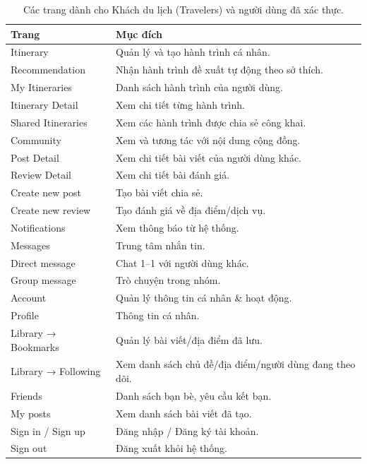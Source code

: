 \begin{table}[H]
\centering
\begin{tabular}{|p{5cm}|p{10cm}|}
\hline
Trang                & Mục đích                                                \\ \hline
Itinerary           & Quản lý và tạo hành trình cá nhân.                      \\ \hline
Recommendation      & Nhận hành trình đề xuất tự động theo sở thích.          \\ \hline
My Itineraries      & Danh sách hành trình của người dùng.                    \\ \hline
Itinerary Detail    & Xem chi tiết từng hành trình.                           \\ \hline
Shared Itineraries  & Xem các hành trình được chia sẻ công khai.              \\ \hline
Community           & Xem và tương tác với nội dung cộng đồng.                \\ \hline
Post Detail         & Xem chi tiết bài viết của người dùng khác.              \\ \hline
Review Detail       & Xem chi tiết bài đánh giá.                              \\ \hline
Create new post     & Tạo bài viết chia sẻ.                                   \\ \hline
Create new review   & Tạo đánh giá về địa điểm/dịch vụ.                       \\ \hline
Notifications       & Xem thông báo từ hệ thống.                              \\ \hline
Messages            & Trung tâm nhắn tin.                                     \\ \hline
Direct message      & Chat 1–1 với người dùng khác.                           \\ \hline
Group message       & Trò chuyện trong nhóm.                                  \\ \hline
Account             & Quản lý thông tin cá nhân \& hoạt động.                 \\ \hline
Profile             & Thông tin cá nhân.                                      \\ \hline
Library → Bookmarks & Quản lý bài viết/địa điểm đã lưu.                       \\ \hline
Library → Following & Xem danh sách chủ đề/địa điểm/người dùng đang theo dõi. \\ \hline
Friends             & Danh sách bạn bè, yêu cầu kết bạn.                      \\ \hline
My posts            & Xem danh sách bài viết đã tạo.                          \\ \hline
Sign in / Sign up   & Đăng nhập / Đăng ký tài khoản.                          \\ \hline
Sign out            & Đăng xuất khỏi hệ thống.                                \\ \hline
\end{tabular}
\caption{Các trang dành cho Khách du lịch (Travelers) và người dùng đã xác thực.}
\label{tab:travelers}
\end{table}

